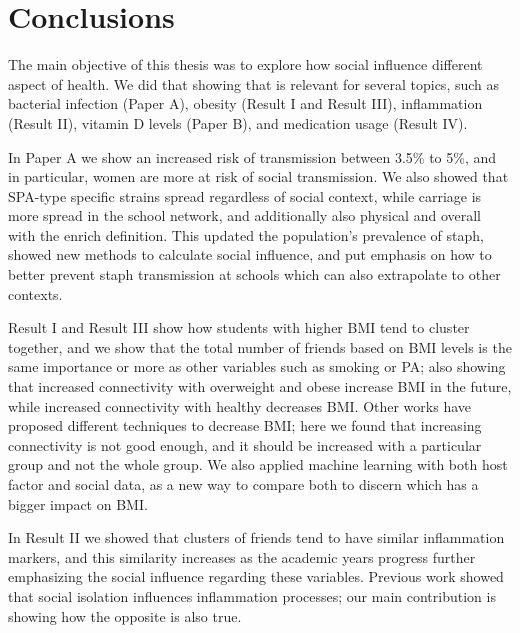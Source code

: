 \chapter{Conclusions}\label{ch:conclussions}



The main objective of this thesis was to explore how social influence different aspect of health. We did that showing that is relevant for several topics, such as bacterial infection (Paper A), obesity (Result I and Result III), inflammation (Result II), vitamin D levels (Paper B), and medication usage (Result IV).


In Paper A we show an increased risk of transmission between 3.5\% to 5\%, and in particular, women are more at risk of social transmission. We also showed that SPA-type specific strains spread regardless of social context, while carriage is more spread in the school network, and additionally also physical and overall with the enrich definition. This updated the population's prevalence of \gls{staph}, showed new methods to calculate social influence, and put emphasis on how to better prevent \gls{staph} transmission at schools which can also extrapolate to other contexts.

Result I and Result III show how students with higher BMI tend to cluster together, and we show that the total number of friends based on BMI levels is the same importance or more as other variables such as smoking or PA; also showing that increased connectivity with overweight and obese increase BMI in the future, while increased connectivity with healthy decreases BMI. Other works have proposed different techniques to decrease BMI; here we found that increasing connectivity is not good enough, and it should be increased with a particular group and not the whole group. We also applied machine learning with both host factor and social data, as a new way to compare both to discern which has a bigger impact on BMI.

In Result II we showed that clusters of friends tend to have similar inflammation markers, and this similarity increases as the academic years progress further emphasizing the social influence regarding these variables. Previous work showed that social isolation influences inflammation processes; our main contribution is showing how the opposite is also true.

